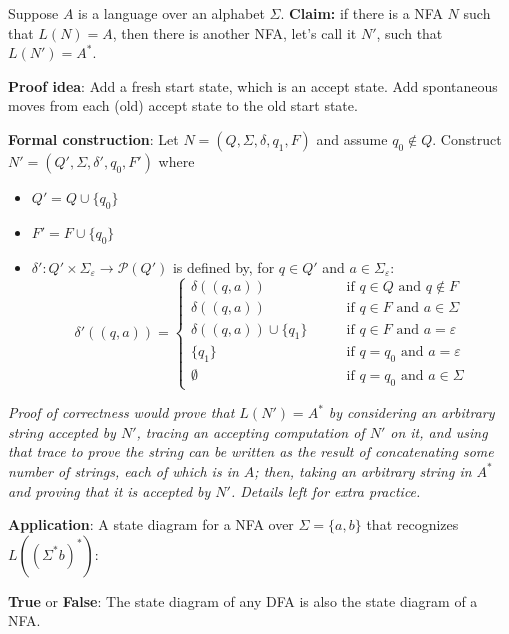 \documentclass[12pt, oneside]{article}
\begin{document}
\newpage

Suppose $A$ is a language over an alphabet $\Sigma$.
{\bf Claim:} if there is a NFA $N$ such that $L(N) = A$, then there is another NFA, let's call it $N'$, such that 
$L(N') = A^*$.

{\bf Proof idea}: Add a fresh start state, which is an accept state. Add spontaneous 
moves from each (old) accept state to the old start state.

{\bf Formal construction}: Let 
$N = (Q, \Sigma, \delta, q_1, F)$ and assume $q_0 \notin Q$.
Construct $N' = (Q', \Sigma, \delta', q_0, F')$ where
\begin{itemize}
    \item $Q' = Q \cup \{q_0\}$
    \item $F' = F \cup \{q_0\}$
    \item $\delta': Q' \times \Sigma_\varepsilon \to \mathcal{P}(Q')$ is defined by, for $q \in Q'$ and $a \in \Sigma_{\varepsilon}$:
        \[
            \delta'((q,a))=\begin{cases}  
                \delta ((q,a)) &\qquad\text{if } q\in Q \textrm{ and } q \notin F\\ 
                \delta ((q,a)) &\qquad\text{if } q\in F \textrm{ and } a \in \Sigma\\ 
                \delta ((q,a)) \cup \{q_1\} &\qquad\text{if } q\in F \textrm{ and } a = \varepsilon\\ 
                \{q_1\} &\qquad\text{if } q = q_0 \textrm{ and } a = \varepsilon \\
                \emptyset &\qquad\text{if } q = q_0 \textrm { and } a \in \Sigma
            \end{cases}
        \]
\end{itemize}


{\it Proof of correctness would prove that $L(N') = A^*$ by considering
an arbitrary string accepted by $N'$, tracing an accepting computation of $N'$ on it, and using 
that trace to prove the string can be written as the result of concatenating some number of strings, 
each of which is in $A$; then, taking an arbitrary 
string in $A^*$ and proving that it is accepted by $N'$. Details left for extra practice.}


{\bf Application}: A state diagram for a NFA over $\Sigma = \{a,b\}$ 
that recognizes $L (( \Sigma^* b)^* )$:

\vspace{200pt}




{\bf True} or {\bf False}: The state diagram of any DFA is also the state diagram of a NFA.
\end{document}
